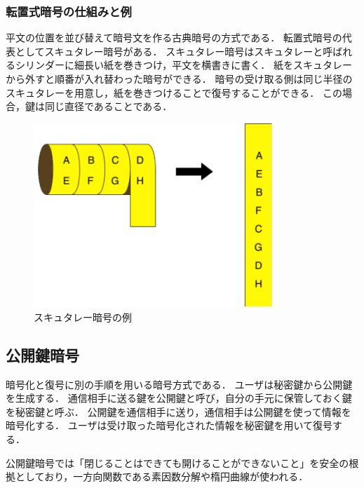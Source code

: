 \documentclass[a4j,12pt]{jsarticle}
\begin{document}
\subsubsection{転置式暗号の仕組みと例}
平文の位置を並び替えて暗号文を作る古典暗号の方式である．
転置式暗号の代表としてスキュタレー暗号がある．
スキュタレー暗号はスキュタレーと呼ばれるシリンダーに細長い紙を巻きつけ，平文を横書きに書く．
紙をスキュタレーから外すと順番が入れ替わった暗号ができる．
暗号の受け取る側は同じ半径のスキュタレーを用意し，紙を巻きつけることで復号することができる．
この場合，鍵は同じ直径であることである．

\begin{figure}[H]
\centering
\includegraphics[width=9cm]{062.pdf}
\caption{スキュタレー暗号の例}
\label{fig:06}
\end{figure} 



\subsection{公開鍵暗号}

暗号化と復号に別の手順を用いる暗号方式である．
ユーザは秘密鍵から公開鍵を生成する．
通信相手に送る鍵を公開鍵と呼び，自分の手元に保管しておく鍵を秘密鍵と呼ぶ．
公開鍵を通信相手に送り，通信相手は公開鍵を使って情報を暗号化する．
ユーザは受け取った暗号化された情報を秘密鍵を用いて復号する．

公開鍵暗号では「閉じることはできても開けることができないこと」を安全の根拠としており，一方向関数である素因数分解や楕円曲線が使われる．
\end{document}
